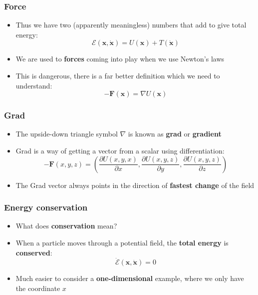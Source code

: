 \documentclass{beamer}
\begin{document}
\begin{frame}
  \center
  \frametitle{Force}
  \begin{itemize}
    \item<1-> Thus we have two (apparently meaningless) numbers that add to give total energy:
      \begin{equation*}
	\mathcal{  E}(\mathbf{x},\dot{\mathbf{x}})=U(\mathbf{x})+T(\dot{\mathbf{x}})
      \end{equation*}
    \item<2-> We are used to \textbf{forces} coming into play when we use Newton's laws
    \item<3-> This is dangerous, there is a far better definition which we need to understand:
      \begin{equation*}
	-\mathbf{F}(\mathbf{x})=\nabla U(\mathbf{x})
      \end{equation*}
  \end{itemize}
\end{frame}

\begin{frame}
  \frametitle{Grad}
  \begin{itemize}
    \item<1-> The upside-down triangle symbol $\nabla$ is known as \textbf{grad} or \textbf{gradient}
    \item<2-> Grad is a way of getting a vector from a scalar using differentiation:
      \begin{equation*}
	-\mathbf{F}(x,y,z)=\left(\frac{\partial U(x,y,x)}{\partial x},\frac{\partial U(x,y,z)}{\partial y},\frac{\partial U(x,y,z)}{\partial z}\right)
      \end{equation*}
    \item<3-> The Grad vector always points in the direction of \textbf{fastest change} of the field
  \end{itemize}
\end{frame}

\begin{frame}
  \frametitle{Energy conservation}
  \begin{itemize}
    \item<1-> What does \textbf{conservation} mean?
    \item<2-> When a particle moves through a potential field, the \textbf{total energy} is \textbf{conserved}:
      \begin{equation*}
	\dot{\mathcal{  E}}(\mathbf{x},\dot{\mathbf{x}})=0
      \end{equation*}
    \item<3-> Much easier to consider a \textbf{one-dimensional} example, where we only have the coordinate $x$
  \end{itemize}
\end{frame}
\end{document}
